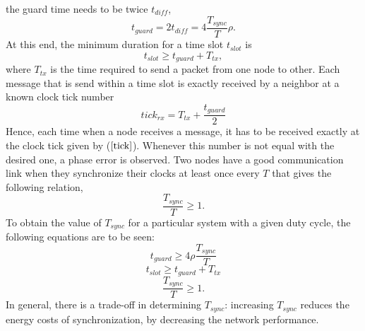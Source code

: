 \documentclass[journal]{IEEEtran}
\begin{document}
the guard time needs to be twice $t_{diff}$,
\begin{equation}
t_{guard}= 2t_{diff} = 4\frac{T_{sync}}{T}\rho.
\end{equation}
At this end, the minimum duration for a time slot $t_{slot}$ is
\begin{equation}
t_{slot} \geq t_{guard} + T_{tx},
\end{equation}
where $T_{tx}$ is the time required to send a packet from one node to other. \newline Each message
that is send within a time slot is exactly received by a neighbor at
a known clock tick number
\begin{equation}
tick_{rx} = T_{tx}+ \frac{t_{guard}}{2} \label{tick}
\end{equation}
Hence, each time when a node receives a message, it has to be
received exactly at the clock tick given by ($\ref{tick}$). Whenever
this number is not equal with the desired one, a phase error is observed. 
\newline Two nodes have a good communication link when they synchronize
their clocks at least once every $T$ that gives the following
relation,
\begin{equation}
\frac{T_{sync}}{T}\geq 1.
\end{equation}
To obtain the value of $T_{sync}$ for a particular system with a given duty cycle, the following equations are to be seen:
\begin{equation}
t_{guard} \geq 4\rho \frac{T_{sync}}{T}
\end{equation}
\begin{equation}
t_{slot} \geq t_{guard} + T_{tx}
\end{equation}
\begin{equation}
\frac{T_{sync}}{T} \geq 1.
\end{equation}
In general, there is a trade-off in determining $T_{sync}$: increasing $T_{sync}$ reduces the energy costs of synchronization, by decreasing the network performance.
\end{document}
